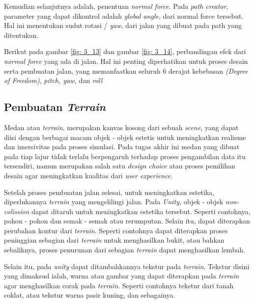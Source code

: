         Kemudian selanjutnya adalah, penentuan \textit{normal force}. Pada \textit{path creator}, parameter yang dapat dikontrol adalah \textit{global angle}, dari normal force tersebut. Hal ini menentukan sudut rotasi / \textit{yaw}, dari jalan yang dibuat pada path yang ditentukan.
        \par Berikut pada gambar \ref{fig: 3_13} dan gambar \ref{fig: 3_14}, perbandingan efek dari \textit{normal force} yang ada di jalan. Hal ini penting diperhatikan untuk proses desain serta pembuatan jalan, yang memanfaatkan seluruh 6 derajat kebebasan \textit{(Degree of Freedom)}, \textit{pitch, yaw,} dan \textit{roll}
	
	\subsection{Pembuatan \textit{Terrain}}
	\vspace{1ex}
	
	Medan atau \textit{terrain}, merupakan kanvas kosong dari sebuah \textit{scene}, yang dapat diisi dengan berbagai macam objek - objek estetis untuk meningkatkan realisme dan imersivitas pada proses simulasi. Pada tugas akhir ini medan yang dibuat pada tiap lajur tidak terlalu berpengaruh terhadap proses pengambilan data itu tersendiri, namun merupakan salah satu \textit{design choice} atau proses pemilihan desain agar meningkatkan kualitas dari \textit{user experience}.
	
	\par Setelah proses pembuatan jalan selesai, untuk meningkatkan estetika, diperlukannya \textit{terrain} yang mengelilingi jalan. Pada \textit{Unity,} objek - objek \textit{non-colission} dapat ditaruh untuk meningkatkan estetika tersebut. Seperti contohnya, pohon - pohon dan semak - semak atau rerumputan. Selain itu, dapat diterapkan perubahan kontur dari \textit{terrain}. Seperti contohnya dapat diterapkan proses peninggian sebagian dari \textit{terrain} untuk menghasilkan bukit, atau bahkan sebaliknya, proses penurunan dari sebagian \textit{terrain} dapat menghasilkan lembah.
	
    Selain itu, pada \textit{unity} dapat ditambahkannya tekstur pada \textit{terrain}. Tekstur disini yang dimaksud ialah, warna atau gambar yang dapat diterapkan pada \textit{terrain} agar menghasilkan corak pada \textit{terrain}. Seperti contohnya tekstur dari tanah coklat, atau tekstur warna pasir kuning, dan sebagainya.
    
